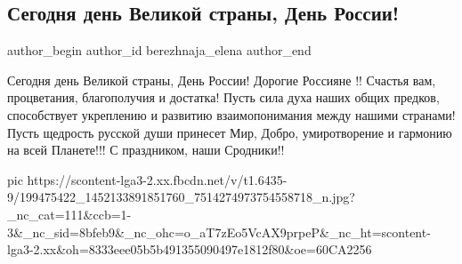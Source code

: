 
 
 
 
 
 
\subsection{Сегодня день Великой страны, День России!}
\label{sec:12_06_2021.fb.berezhnaja_elena.1.den_rossii}
\ifcmt
 author_begin
   author_id berezhnaja_elena
 author_end
\fi

Сегодня день Великой страны, День России! Дорогие Россияне !! Счастья вам,
процветания, благополучия и достатка! Пусть сила духа наших общих предков,
способствует укреплению и развитию взаимопонимания между нашими странами! Пусть
щедрость русской души принесет Мир, Добро, умиротворение и гармонию на всей
Планете!!! С праздником, наши Сродники!!

\ifcmt
  pic https://scontent-lga3-2.xx.fbcdn.net/v/t1.6435-9/199475422_1452133891851760_7514274973754558718_n.jpg?_nc_cat=111&ccb=1-3&_nc_sid=8bfeb9&_nc_ohc=o_aT7zEo5VcAX9prpeP&_nc_ht=scontent-lga3-2.xx&oh=8333eee05b5b491355090497e1812f80&oe=60CA2256
\fi
